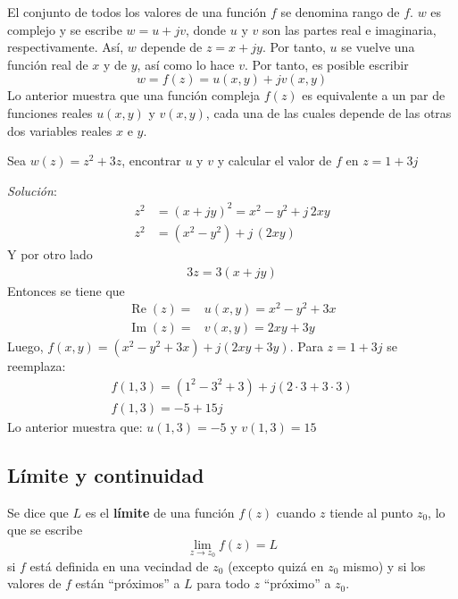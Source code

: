 El conjunto de todos los valores de una función $f$ se denomina rango de $f$. $w$ es complejo y se escribe $w=u+jv$, donde $u$ y $v$ son las partes real e imaginaria, respectivamente. Así, $w$ depende de $z=x+jy$. Por tanto, $u$ se vuelve una función real de $x$ y de $y$, así como lo hace $v$. Por tanto, es posible escribir
\begin{equation*}
  \boxed{w=f(z)=u(x,y)+jv(x,y)}
\end{equation*}
Lo anterior muestra que una función compleja $f(z)$ es equivalente a un par de funciones reales $u(x,y)$ y $v(x,y)$, cada una de las cuales depende de las otras dos variables reales $x$ e $y$.
\begin{example}
  Sea $w(z)=z^2 + 3z$, encontrar $u$ y $v$ y calcular el valor de $f$ en $z=1+3j$

  \textit{Solución}:
  \begin{align*}
    z^2 &= (x+jy)^2 = x^2 - y^2 + j\,2xy \\ 
    z^2 &= (x^2 - y^2) + j\, (2xy)
  \end{align*}
  Y por otro lado
  \begin{align*}
    3z = 3(x+jy)
  \end{align*}
  Entonces se tiene que
  \begin{align*}
    \operatorname{Re}(z) =& u(x,y) = x^2 - y^2 + 3x \\ 
    \operatorname{Im}(z) =& v(x,y) = 2xy + 3y
  \end{align*}
  Luego, $f(x,y)= (x^2-y^2+3x) + j(2xy+3y)$. Para $z=1+3j$ se reemplaza:
  \begin{align*}
    f(1,3)=(1^2-3^2+3) + j(2\cdot 3 + 3\cdot 3) \\ 
    f(1,3)=-5+15j
  \end{align*}
  Lo anterior muestra que: $u(1,3)=-5$ y $v(1,3)=15$
\end{example}

\subsection{Límite y continuidad}
\label{sec:limite}

Se dice que $L$ es el \textbf{límite} de una función $f(z)$ cuando $z$ tiende al punto $z_0$, lo que se escribe
\begin{equation}
  \lim_{z\to z_0}f(z)=L
\end{equation}
si $f$ está definida en una vecindad de $z_0$ (excepto quizá en $z_0$ mismo) y si los valores de $f$ están ``próximos'' a $L$ para todo $z$ ``próximo'' a $z_0$.

